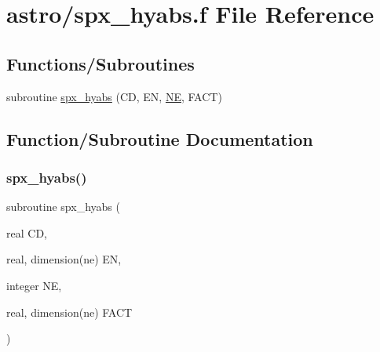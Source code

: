 \hypertarget{spx__hyabs_8f}{}\section{astro/spx\+\_\+hyabs.f File Reference}
\label{spx__hyabs_8f}
\subsection*{Functions/\+Subroutines}
\begin{DoxyCompactItemize}
\item 
subroutine \hyperlink{spx__hyabs_8f_a1b3b32938d067cef5334c9dc06145a4e}{spx\+\_\+hyabs} (CD, EN, \hyperlink{eval__tab_8h_a5af9139e882aef6c820ae908589a40d6}{NE}, F\+A\+CT)
\end{DoxyCompactItemize}


\subsection{Function/\+Subroutine Documentation}
\mbox{\label{spx__hyabs_8f_a1b3b32938d067cef5334c9dc06145a4e}} 
\subsubsection{\texorpdfstring{spx\+\_\+hyabs()}{spx\_hyabs()}}
{\footnotesize\ttfamily subroutine spx\+\_\+hyabs (\begin{DoxyParamCaption}\item[{real}]{CD,  }\item[{real, dimension(ne)}]{EN,  }\item[{integer}]{NE,  }\item[{real, dimension(ne)}]{F\+A\+CT }\end{DoxyParamCaption})}

